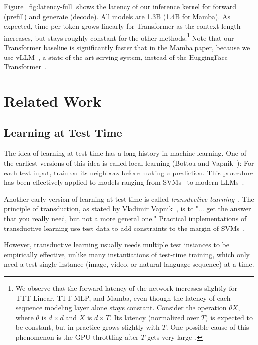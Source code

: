 \documentclass{article}
\begin{document}
Figure~\ref{fig:latency-full} shows the latency of our inference kernel for forward (prefill) and generate (decode). 
All models are 1.3B (1.4B for Mamba).
As expected, time per token grows linearly for Transformer as the context length increases, but stays roughly constant for the other methods.\footnote{\label{footnote:15}
We observe that the forward latency of the network increases slightly for TTT-Linear, TTT-MLP, and Mamba, even though the latency of each sequence modeling layer alone stays constant.
Consider the operation $\theta X$, where $\theta$ is $d\times d$ and $X$ is $d\times T$.
Its latency (normalized over $T$) is expected to be constant, but in practice grows slightly with $T$.
One possible cause of this phenomenon is the GPU throttling after $T$ gets very large~\cite{horace2024}.
}
Note that our Transformer baseline is significantly faster that in the Mamba paper, because we use vLLM~\cite{kwon2023efficient}, a state-of-the-art serving system, instead of the HuggingFace Transformer~\cite{wolf2019huggingface}.

\section{Related Work}
\label{sec:rel}

\subsection{Learning at Test Time}
\label{subsec:rel-ttt}

The idea of learning at test time has a long history in machine learning.
One of the earliest versions of this idea is called local learning (Bottou and Vapnik~\cite{bottou1992local}):
For each test input, train on its neighbors before making a prediction.
This procedure has been effectively applied to models ranging from SVMs~\cite{zhang2006svm} to modern LLMs~\cite{hardt2023test}.

Another early version of learning at test time is called \emph{transductive learning}~\cite{Gammerman98learningby}.
The principle of transduction, as stated by Vladimir Vapnik~\cite{vapnik2013nature}, is to
"... get the answer that you really need, but not a more general one."
Practical implementations of transductive learning use test data to add constraints to the margin of SVMs~\cite{joachims2002learning, collobert2006large}.

However, transductive learning usually needs multiple test instances to be empirically effective, unlike many instantiations of test-time training, which only need a test single instance (image, video, or natural language sequence) at a time.
\end{document}
